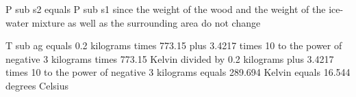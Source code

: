 P sub s2 equals P sub s1 since the weight of the wood and the weight of the ice-water mixture as well as the surrounding area do not change

T sub ag equals 0.2 kilograms times 773.15 plus 3.4217 times 10 to the power of negative 3 kilograms times 773.15 Kelvin divided by 0.2 kilograms plus 3.4217 times 10 to the power of negative 3 kilograms equals 289.694 Kelvin equals 16.544 degrees Celsius